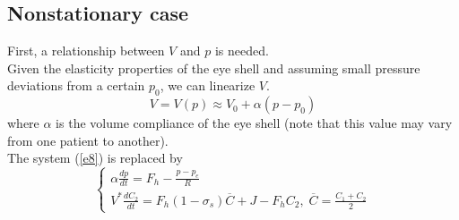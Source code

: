 \documentclass[english,12pt]{article}
\begin{document}
\subsection{Nonstationary case}
First, a relationship between $V$ and $p$ is needed.\\
Given the elasticity properties of the eye shell and assuming small pressure deviations from a certain $p_0$, we can linearize $V$.
\begin{equation}
V = V(p) \approx V_0 + \alpha (p-p_0)
\end{equation}
where $\alpha$ is the volume compliance of the eye shell (note that this value may vary from one patient to another).\\
The system (\ref{e8}) is replaced by
\begin{equation}\label{e11}
\left\{\begin{array}{ll}
 \alpha \displaystyle{\frac{dp}{dt}}=F_{h}-\displaystyle{\frac{p-p_e}{R}}\\
V^{\ast} \displaystyle{\frac{dC_{2}}{dt}}= F_h(1-\sigma_s)\overline{C} + J - F_hC_2,\; \overline{C}= \frac{C_1+C_2}{2}
\end{array}\right.
\end{equation}
\end{document}

